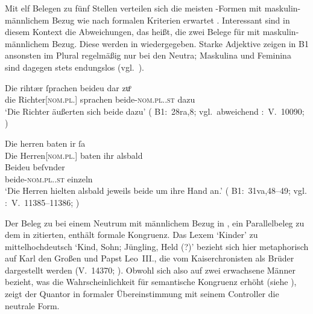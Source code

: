 Mit elf Belegen zu fünf Stellen verteilen sich die meisten
-Formen mit maskulin-männlichem Bezug wie nach formalen Kriterien
erwartet \autocite[vgl.][182]{ksw2}. Interessant sind in diesem Kontext die
Abweichungen, das heißt, die zwei Belege für  mit
maskulin-männlichem Bezug. Diese werden in  wiedergegeben.
Starke Adjektive zeigen in B1 ansonsten  im Plural
regel\-mäßig nur bei den Neutra; Maskulina und Feminina sind dagegen stets
endungslos (vgl.~).

\begin{exe}
\ex \label{ex:richtherriu}
	\begin{xlist}
	\ex \gll Die rihtær ſprachen beideu {dar zuͦ} \\
			die Richter[\textsc{nom.pl.\MascM}] sprachen beide-\textsc{nom.pl.\NeutM.st}
			dazu \\
		\trans `Die Richter äußerten sich beide dazu'
			(%
				B1:~28ra,8; vgl.~abweichend
				\KC:~V.~10090;
				\cite[267]{schroeder1895}%
			)
		\label{ex:richtherriu_1}

	\ex \gll Die herren baten ir ſa \\
			Die Herren[\textsc{nom.pl.\MascM}] baten ihr alsbald \\
	\sn \gll Beideu beſvnder \\
			beide-\textsc{nom.pl.\NeutM.st} einzeln \\
		\trans `Die Herren hielten alsbald jeweils beide um ihre Hand an.'
			(%
				B1:~31va,48--49; vgl.
				\KC:~V.~11385--11386;
				\cite[289]{schroeder1895}%
			)
		\label{ex:richtherriu_2}
	\end{xlist}
\end{exe}

\label{phsec:baideuwarn}
Der Beleg zu  bei einem Neutrum mit männlichem Bezug in
, ein Parallelbeleg zu dem in 
zitierten, enthält formale Kongruenz. Das Lexem  `Kinder' zu
mittelhochdeutsch  `Kind, Sohn; Jüngling, Held
(?)' \autocites[s.\,v.]{mwb1}[vgl.~auch][53]{kroonen2013} bezieht sich
hier metaphorisch auf Karl den Großen und Papst Leo~III., die vom
Kaiserchronisten als Brüder dargestellt werden (V.~14370;
\cites[341]{schroeder1895}[vgl.][83]{weis2022}). Obwohl sich  also
auf zwei erwachsene Männer bezieht, was die Wahrscheinlichkeit für semantische
Kongruenz erhöht (siehe ), zeigt der Quantor in formaler
Übereinstimmung mit seinem Controller die neutrale Form.

